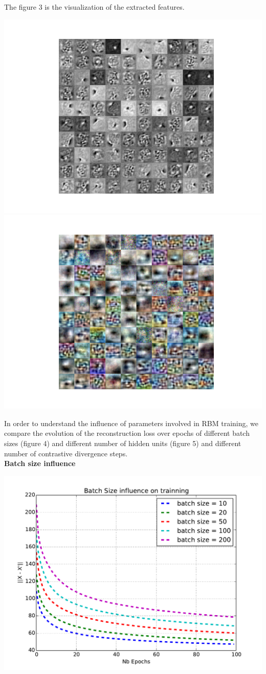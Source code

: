 \documentclass[landscape,a1paper,fontscale=0.5]{baposter} %
\begin{document}
\begin{poster}
{\begin{multicols}{2}
The figure 3 is the visualization of the extracted features.

\begin{center}
\includegraphics[width=0.4\linewidth]{MNIST_Filter_20Epochs}
\includegraphics[width=0.4\linewidth]{CIFAR_LearnedWeights}
\end{center}

In order to understand the influence of parameters involved in RBM training, we compare the evolution of the reconstruction loss over epochs of different batch sizes (figure 4) and different number of hidden units (figure 5) and different number of contrastive divergence steps.\\

\textbf{Batch size influence}
\begin{center}
	\centering
	\includegraphics[width=\linewidth,height=0.65\linewidth]{batchsize}
\end{center}


\end{multicols}}
\end{poster}
\end{document}
